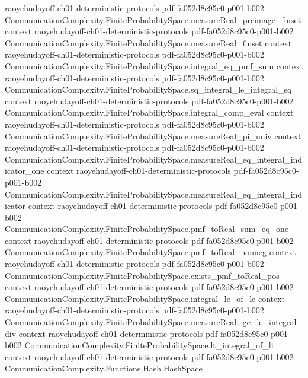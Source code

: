 \begin{theorem}
  {raoyehudayoff-ch01-deterministic-protocols}
  {pdf-fa052d8c95c0-p001-b002}
\proofstep
  {CommunicationComplexity.FiniteProbabilitySpace.measureReal_preimage_finset}
  {context}
  {raoyehudayoff-ch01-deterministic-protocols}
  {pdf-fa052d8c95c0-p001-b002}
\proofstep
  {CommunicationComplexity.FiniteProbabilitySpace.measureReal_finset}
  {context}
  {raoyehudayoff-ch01-deterministic-protocols}
  {pdf-fa052d8c95c0-p001-b002}
\proofstep
  {CommunicationComplexity.FiniteProbabilitySpace.integral_eq_pmf_sum}
  {context}
  {raoyehudayoff-ch01-deterministic-protocols}
  {pdf-fa052d8c95c0-p001-b002}
\proofstep
  {CommunicationComplexity.FiniteProbabilitySpace.sq_integral_le_integral_sq}
  {context}
  {raoyehudayoff-ch01-deterministic-protocols}
  {pdf-fa052d8c95c0-p001-b002}
\proofstep
  {CommunicationComplexity.FiniteProbabilitySpace.integral_comp_eval}
  {context}
  {raoyehudayoff-ch01-deterministic-protocols}
  {pdf-fa052d8c95c0-p001-b002}
\proofstep
  {CommunicationComplexity.FiniteProbabilitySpace.measureReal_pi_univ}
  {context}
  {raoyehudayoff-ch01-deterministic-protocols}
  {pdf-fa052d8c95c0-p001-b002}
\proofstep
  {CommunicationComplexity.FiniteProbabilitySpace.measureReal_eq_integral_indicator_one}
  {context}
  {raoyehudayoff-ch01-deterministic-protocols}
  {pdf-fa052d8c95c0-p001-b002}
\proofstep
  {CommunicationComplexity.FiniteProbabilitySpace.measureReal_eq_integral_indicator}
  {context}
  {raoyehudayoff-ch01-deterministic-protocols}
  {pdf-fa052d8c95c0-p001-b002}
\proofstep
  {CommunicationComplexity.FiniteProbabilitySpace.pmf_toReal_sum_eq_one}
  {context}
  {raoyehudayoff-ch01-deterministic-protocols}
  {pdf-fa052d8c95c0-p001-b002}
\proofstep
  {CommunicationComplexity.FiniteProbabilitySpace.pmf_toReal_nonneg}
  {context}
  {raoyehudayoff-ch01-deterministic-protocols}
  {pdf-fa052d8c95c0-p001-b002}
\proofstep
  {CommunicationComplexity.FiniteProbabilitySpace.exists_pmf_toReal_pos}
  {context}
  {raoyehudayoff-ch01-deterministic-protocols}
  {pdf-fa052d8c95c0-p001-b002}
\proofstep
  {CommunicationComplexity.FiniteProbabilitySpace.integral_le_of_le}
  {context}
  {raoyehudayoff-ch01-deterministic-protocols}
  {pdf-fa052d8c95c0-p001-b002}
\proofstep
  {CommunicationComplexity.FiniteProbabilitySpace.measureReal_ge_le_integral_div}
  {context}
  {raoyehudayoff-ch01-deterministic-protocols}
  {pdf-fa052d8c95c0-p001-b002}
\proofstep
  {CommunicationComplexity.FiniteProbabilitySpace.lt_integral_of_lt}
  {context}
  {raoyehudayoff-ch01-deterministic-protocols}
  {pdf-fa052d8c95c0-p001-b002}
\proofstep
  {CommunicationComplexity.Functions.Hash.HashSpace}

\end{theorem}
